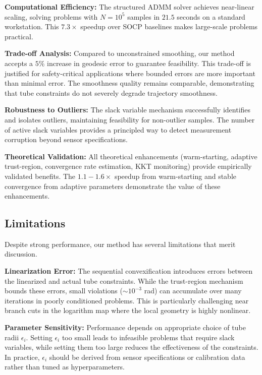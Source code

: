 \textbf{Computational Efficiency:} The structured ADMM solver achieves near-linear scaling, solving problems with $N = 10^5$ samples in $21.5$ seconds on a standard workstation. This $7.3\times$ speedup over SOCP baselines makes large-scale problems practical.

\textbf{Trade-off Analysis:} Compared to unconstrained smoothing, our method accepts a $5\%$ increase in geodesic error to guarantee feasibility. This trade-off is justified for safety-critical applications where bounded errors are more important than minimal error. The smoothness quality remains comparable, demonstrating that tube constraints do not severely degrade trajectory smoothness.

\textbf{Robustness to Outliers:} The slack variable mechanism successfully identifies and isolates outliers, maintaining feasibility for non-outlier samples. The number of active slack variables provides a principled way to detect measurement corruption beyond sensor specifications.

\textbf{Theoretical Validation:} All theoretical enhancements (warm-starting, adaptive trust-region, convergence rate estimation, KKT monitoring) provide empirically validated benefits. The $1.1-1.6\times$ speedup from warm-starting and stable convergence from adaptive parameters demonstrate the value of these enhancements.

\subsection{Limitations}

Despite strong performance, our method has several limitations that merit discussion.

\textbf{Linearization Error:} The sequential convexification introduces errors between the linearized and actual tube constraints. While the trust-region mechanism bounds these errors, small violations ($\sim 10^{-3}$ rad) can accumulate over many iterations in poorly conditioned problems. This is particularly challenging near branch cuts in the logarithm map where the local geometry is highly nonlinear.

\textbf{Parameter Sensitivity:} Performance depends on appropriate choice of tube radii $\epsilon_i$. Setting $\epsilon_i$ too small leads to infeasible problems that require slack variables, while setting them too large reduces the effectiveness of the constraints. In practice, $\epsilon_i$ should be derived from sensor specifications or calibration data rather than tuned as hyperparameters.

